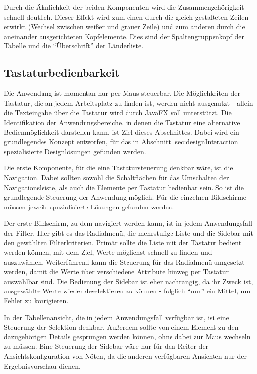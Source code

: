 Durch die Ähnlichkeit der beiden Komponenten wird die Zusammengehörigkeit schnell deutlich. Dieser Effekt wird zum einen durch die gleich gestalteten Zeilen erwirkt (Wechsel zwischen weißer und grauer Zeile) und zum anderen durch die aneinander ausgerichteten Kopfelemente. Dies sind der Spaltengruppenkopf der Tabelle und die \enquote{Überschrift} der Länderliste.\par
\subsection{Tastaturbedienbarkeit}
Die Anwendung ist momentan nur per Maus steuerbar. Die Möglichkeiten der Tastatur, die an jedem Arbeitsplatz zu finden ist, werden nicht ausgenutzt - allein die Texteingabe über die Tastatur wird durch JavaFX voll unterstützt. Die Identifikation der Anwendungsbereiche, in denen die Tastatur eine alternative Bedienmöglichkeit darstellen kann, ist Ziel dieses Abschnittes. Dabei wird ein grundlegendes Konzept entworfen, für das in Abschnitt \ref{sec:designInteraction} spezialisierte Designlösungen gefunden werden.\par
Die erste Komponente, für die eine Tastatursteuerung denkbar wäre, ist die Navigation. Dabei sollten sowohl die Schaltflächen für das Umschalten der Navigationsleiste, als auch die Elemente per Tastatur bedienbar sein. So ist die grundlegende Steuerung der Anwendung möglich. Für die einzelnen Bildschirme müssen jeweils spezialisierte Lösungen gefunden werden.\par
Der erste Bildschirm, zu dem navigiert werden kann, ist in jedem Anwendungsfall der Filter. Hier gibt es das Radialmenü, die mehrstufige Liste und die Sidebar mit den gewählten Filterkriterien. Primär sollte die Liste mit der Tastatur bedient werden können, mit dem Ziel, Werte möglichst schnell zu finden und auszuwählen. Weiterführend kann die Steuerung für das Radialmenü umgesetzt werden, damit die Werte über verschiedene Attribute hinweg per Tastatur auswählbar sind. Die Bedienung der Sidebar ist eher nachrangig, da ihr Zweck ist, ausgewählte Werte wieder deselektieren zu können - folglich \enquote{nur} ein Mittel, um Fehler zu korrigieren.\par
In der Tabellenansicht, die in jedem Anwendungsfall verfügbar ist, ist eine Steuerung der Selektion denkbar. Außerdem sollte von einem Element zu den dazugehörigen Details gesprungen werden können, ohne dabei zur Maus wechseln zu müssen. Eine Steuerung der Sidebar wäre nur für den Reiter der Ansichtskonfiguration von Nöten, da die anderen verfügbaren Ansichten nur der Ergebnisvorschau dienen.\par
